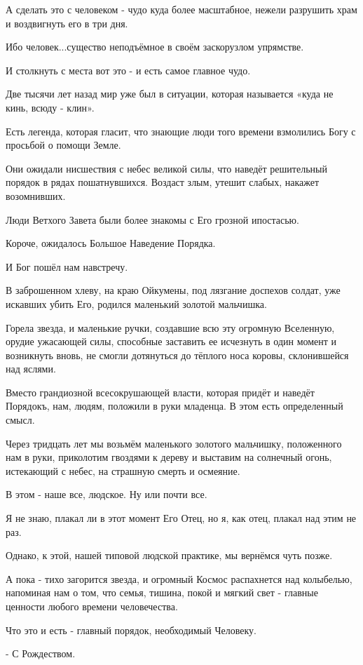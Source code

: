 А сделать это с человеком - чудо куда более масштабное, нежели разрушить храм и
воздвигнуть его в три дня.

Ибо человек...существо неподъёмное в своём заскорузлом упрямстве.

И столкнуть с места вот это - и есть самое главное чудо. 

Две тысячи лет назад мир уже был в ситуации, которая называется «куда не кинь,
всюду - клин».

Есть легенда, которая гласит, что знающие люди того времени взмолились Богу с
просьбой о помощи Земле. 

Они ожидали нисшествия с небес великой силы, что наведёт решительный порядок в
рядах пошатнувшихся. Воздаст злым, утешит слабых, накажет возомнивших. 

Люди Ветхого Завета были более знакомы с Его грозной ипостасью. 

Короче, ожидалось Большое Наведение Порядка.

И Бог пошёл нам навстречу.

В заброшенном хлеву, на краю Ойкумены, под лязгание доспехов солдат, уже
искавших убить Его, родился маленький золотой мальчишка.

Горела звезда, и маленькие ручки, создавшие всю эту огромную Вселенную, орудие
ужасающей силы, способные заставить ее исчезнуть в один момент и возникнуть
вновь, не смогли дотянуться до тёплого носа коровы, склонившейся над яслями. 

Вместо грандиозной всесокрушающей власти, которая придёт и наведёт Порядокъ,
нам, людям, положили в руки младенца. В этом есть определенный смысл. 

Через тридцать лет мы возьмём маленького золотого мальчишку, положенного нам в
руки, приколотим гвоздями к дереву и выставим на солнечный огонь, истекающий с
небес, на страшную смерть и осмеяние.

В этом - наше все, людское. Ну или почти все. 

Я не знаю, плакал ли в этот момент Его Отец, но я, как отец, плакал над этим не
раз. 

Однако, к этой, нашей типовой людской практике, мы вернёмся чуть позже. 

А пока - тихо загорится звезда, и огромный Космос распахнется над колыбелью,
напоминая нам о том, что семья, тишина, покой и мягкий свет - главные ценности
любого времени человечества. 

Что это и есть - главный порядок, необходимый Человеку. 

- С Рождеством.
